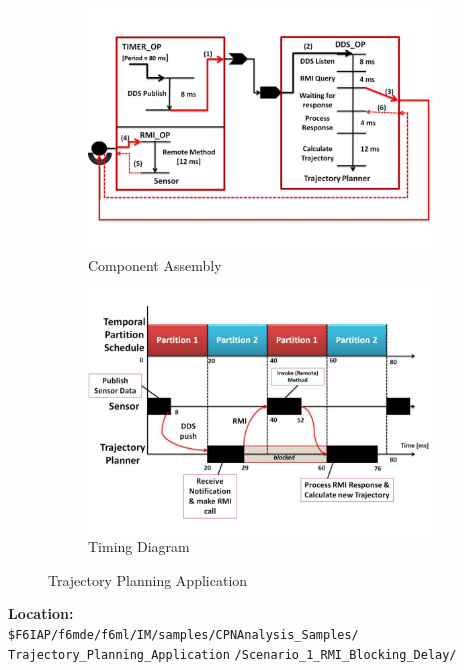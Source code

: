 \begin{figure}
        \centering
        \begin{subfigure}[b]{0.5\textwidth}
                \includegraphics[width=\textwidth]{./figs/CPN_TPA}
                \caption{Component Assembly}
                \label{fig:CA}
        \end{subfigure}%
        \begin{subfigure}[b]{0.5\textwidth}
                \includegraphics[width=\textwidth]{./figs/CPN_TPA_TD}
                \caption{Timing Diagram}
                \label{fig:TPA_TD}
        \end{subfigure}
        \caption{Trajectory Planning Application}\label{fig:TPA}
\end{figure}

\noindent\textbf{Location:}\\
\texttt{\$F6IAP/f6mde/f6ml/IM/samples/CPNAnalysis\_Samples/ \\ Trajectory\_Planning\_Application}
   \texttt{/Scenario\_1\_RMI\_Blocking\_Delay/}

